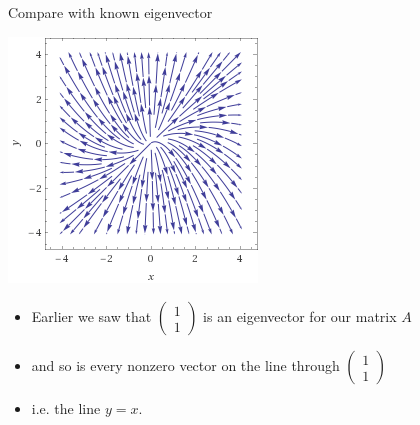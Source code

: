 \documentclass{beamer}
\begin{document}
\begin{frame}{Compare with known eigenvector}


\begin{center}
\includegraphics[scale=0.45]{stream1}
\end{center}

\begin{itemize}
\item Earlier we saw that
$
\begin{pmatrix}
1 \\
1
\end{pmatrix}
$
is an eigenvector for our matrix $A$
\item and so is every nonzero vector on the line through
$
\begin{pmatrix}
1 \\
1
\end{pmatrix}
$
\item i.e. the line $y=x$.
\end{itemize}
\end{frame}

\end{document}

